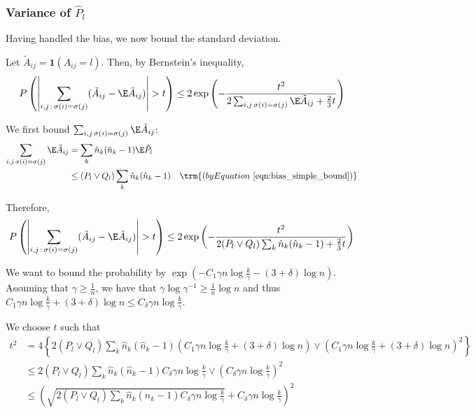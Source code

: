 \documentclass{article}
\begin{document}
\subsubsection{Variance of $\hat{P}_l$}

Having handled the bias, we now bound the standard deviation.

Let $ \tilde{A}_{ij} = \mathbf{1}(A_{ij} = l)$. Then, by Bernstein's inequality,
\[
P\left( \left| \sum_{i,j\,:\, \sigma(i) = \sigma(j)} (\tilde{A}_{ij} - \E \tilde{A}_{ij} ) \right|  > t 
 \right) \leq 2 \exp\left( 
    - \frac{t^2}{ 2 \sum_{i,j \, \sigma(i) = \sigma(j)} \E \tilde{A}_{ij}  + \frac{2}{3}t } 
\right)
\]

We first bound $\sum_{i,j \, \sigma(i) = \sigma(j)} \E \tilde{A}_{ij}$:
\begin{align*}
\sum_{i,j \, \sigma(i) = \sigma(j)} \E \tilde{A}_{ij} &=
  \sum_k \hat{n}_k (\hat{n}_k - 1) \E \hat{P}_l \\
 &\leq (P_l \vee Q_l) \sum_k \hat{n}_k (\hat{n}_k - 1) \quad 
  \trm{(by Equation~\ref{eqn:bias_simple_bound})}
\end{align*}

Therefore,
\[
P\left( \left| \sum_{i,j\,:\, \sigma(i) = \sigma(j)} (\tilde{A}_{ij} - \E \tilde{A}_{ij} ) \right|  > t 
 \right) \leq 2 \exp\left( 
    - \frac{t^2}{ 2 (P_l \vee Q_l) \sum_k \hat{n}_k (\hat{n}_k - 1)  + \frac{2}{3}t } 
\right)
\]

We want to bound the probability by $\exp( - C_1 \gamma n \log \frac{k}{\gamma} - (3+\delta) \log n )$. Assuming that $\gamma \geq \frac{1}{n}$, we have that $\gamma \log \gamma^{-1} \geq \frac{1}{n} \log n$ and thus $C_1 \gamma n \log \frac{k}{\gamma} + (3 + \delta) \log n \leq C_\delta \gamma n \log \frac{k}{\gamma}$. 

We choose $t$ such that
\begin{align*}
t^2 &=4 \left\{  2 (P_l \vee Q_l) \sum_k \hat{n}_k (\hat{n}_k - 1) \left( 
    C_1 \gamma n \log \frac{k}{\gamma} + (3+\delta) \log n \right) \vee 
   \left( C_1 \gamma n \log \frac{k}{\gamma} + (3 + \delta) \log n \right)^2 \right\} \\
 &\leq 2 (P_l \vee Q_l) \sum_k \hat{n}_k (\hat{n}_k - 1) C_{\delta} \gamma n \log \frac{k}{\gamma} \vee \left( C_\delta \gamma n \log \frac{k}{\gamma} \right)^2  \\
 &\leq \left( \sqrt{  2 (P_l \vee Q_l)  \sum_k \hat{n}_k (\hat{n}_k - 1) C_\delta \gamma n \log \frac{k}{\gamma} } + C_\delta \gamma n \log \frac{k}{\gamma} \right)^2
\end{align*}
\end{document}
